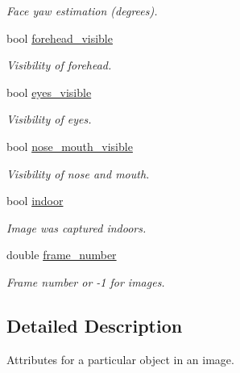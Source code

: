 \begin{DoxyCompactItemize}
\begin{DoxyCompactList}\small\item\em Face yaw estimation (degrees). \end{DoxyCompactList}\item 
bool \hyperlink{structjanice__attributes_a1082879a8605238978f51c8ccc9bcbe9}{forehead\+\_\+visible}
\begin{DoxyCompactList}\small\item\em Visibility of forehead. \end{DoxyCompactList}\item 
bool \hyperlink{structjanice__attributes_a71a354e98dc2ac412ac310ac5f2ff490}{eyes\+\_\+visible}
\begin{DoxyCompactList}\small\item\em Visibility of eyes. \end{DoxyCompactList}\item 
bool \hyperlink{structjanice__attributes_a028b722cfc108c4f84a27b8f4423455d}{nose\+\_\+mouth\+\_\+visible}
\begin{DoxyCompactList}\small\item\em Visibility of nose and mouth. \end{DoxyCompactList}\item 
bool \hyperlink{structjanice__attributes_a9376c226f494d7e061fca55850094798}{indoor}
\begin{DoxyCompactList}\small\item\em Image was captured indoors. \end{DoxyCompactList}\item 
\hypertarget{structjanice__attributes_a641e8d247654bd494905562904f25b5b}{}double \hyperlink{structjanice__attributes_a641e8d247654bd494905562904f25b5b}{frame\+\_\+number}\label{structjanice__attributes_a641e8d247654bd494905562904f25b5b}

\begin{DoxyCompactList}\small\item\em Frame number or -\/1 for images. \end{DoxyCompactList}\end{DoxyCompactItemize}


\subsection{Detailed Description}
Attributes for a particular object in an image. 

